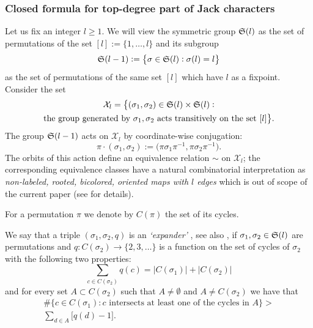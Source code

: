 \documentclass[12pt,usenames,dvipsnames,svgnames,table]{amsart}
\begin{document}
\subsubsection{Closed formula for top-degree part of Jack characters}
\label{sec:top-degree-by-Sniady}
Let us fix an integer $l\geq 1$.
We will view the symmetric group $\mathfrak{S}(l)$ as the set of permutations of the set
$[l]:=\{1,\dots,l\}$ and its subgroup 
\[\mathfrak{S}(l-1):=\big\{ \sigma\in\mathfrak{S}(l) : \sigma(l)=l \big\}\] 
as the set of permutations of the same set $[l]$ which have $l$ as a fixpoint.
Consider the set 
\begin{multline*}
\mathcal{X}_l= \big\{ (\sigma_1,\sigma_2) \in \mathfrak{S}(l)\times \mathfrak{S}(l) : \\
\text{the group generated by $\sigma_1,\sigma_2$ acts transitively on the set $[l]$}
\big\}.   
\end{multline*}
The group $\mathfrak{S}(l-1)$ acts on $\mathcal{X}_l$ by coordinate-wise conjugation:
\[ \pi\cdot (\sigma_1,\sigma_2) := \big(\pi \sigma_1 \pi^{-1}, \pi \sigma_2 \pi^{-1}\big). \]
The orbits of this action define an equivalence relation $\sim$ on $\mathcal{X}_l$;
the corresponding equivalence classes have a natural combinatorial interpretation as
\emph{non-labeled, rooted, bicolored, oriented maps with $l$ edges} 
which is out of scope of the current paper
(see \cite[Section 1.4.3]{Sniady-AsymptoticsJack} for details).

\medskip

For a permutation $\pi$ we denote by $C(\pi)$ the set of its cycles.

We say that a triple $(\sigma_1,\sigma_2,q)$ is an \emph{`expander'}
\cite[Appendix A.1]{Sniady-AsymptoticsJack}, see also \cite{DolegaFeraySniady2008}, 
if $\sigma_1,\sigma_2\in\mathfrak{S}(l)$ are permutations
and $q\colon C(\sigma_2)\to\{2,3,\dots\}$ is a function on the set of cycles of $\sigma_2$
with the following two properties:
\[ \sum_{c\in C(\sigma_2)} q(c) = |C(\sigma_1)|+|C(\sigma_2)|\]
and for every set $A\subset C(\sigma_2)$ such that $A\neq \emptyset$ and $A\neq C(\sigma_2)$
we have that
\begin{multline*}
\#\big\{ c\in C(\sigma_1): \text{$c$ intersects at least one of the cycles in $A$} \big\} > \\
\sum_{d\in A} \big[ q(d)-1  \big].
\end{multline*}
\end{document}
